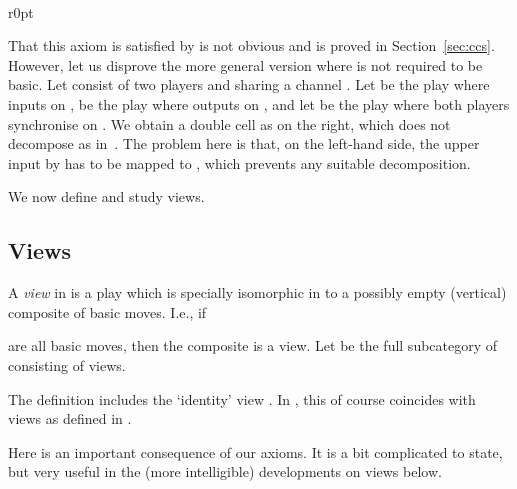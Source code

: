 \documentclass{LMCS}
\theoremstyle{plain}\newtheorem{satz}[thm]{Satz}
\begin{document}
\begin{exa} \hfill \  \linebreak
\begin{minipage}{\textwidth}
\begin{wrapfigure}[6]{r}{0pt}
  \begin{minipage}[c]{0.18\linewidth}
    \vspace*{-1.5em}
  \end{minipage}
\end{wrapfigure}
That this axiom is satisfied by  is not obvious and is proved
in Section~\ref{sec:ccs}. However, let us disprove the more general
version where  is not required to be basic. Let  consist of two
players  and  sharing a channel . Let 
be the play where  inputs on ,  be the
play where  outputs on , and let  be the
play where both players synchronise on .  We obtain a double cell
as on the right, which does not decompose as
in~. The problem here is that, on the left-hand
side, the upper input by  has to be mapped to , which prevents any
suitable decomposition.
\end{minipage}
\end{exa}

We now define and study views.

\subsection{Views}\label{subsec:views}
\begin{defi}
  A \emph{view} in  is a play which is specially isomorphic in
   to a possibly empty (vertical) composite of basic moves. I.e.,
  if

are all basic moves, then the composite is a view. Let  be the
full subcategory of  consisting of views.
\end{defi}
The definition includes the `identity' view . In ,
this of course coincides with views as defined in
.

Here is an important consequence of our axioms. It is a bit
complicated to state, but very useful in the (more intelligible)
developments on views below.
\end{document}
